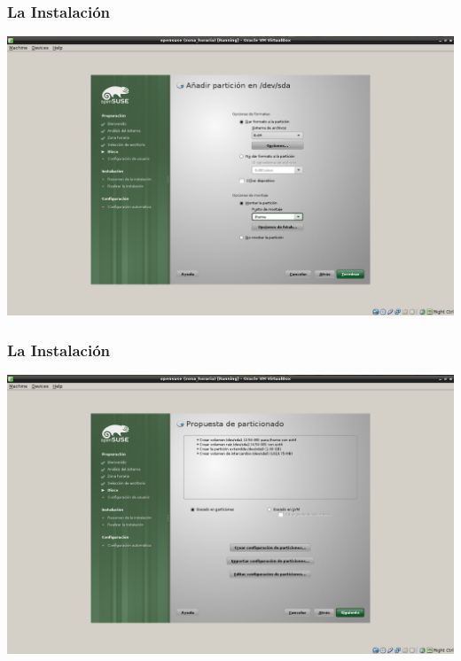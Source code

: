 \documentclass{beamer}
\begin{document}
\begin{frame}
\frametitle{La Instalaci\'on}
\includegraphics[height=0.8\textheight]{10.png} \hspace*{7.3cm}
\end{frame} 

\begin{frame}
\frametitle{La Instalaci\'on}
\includegraphics[height=0.8\textheight]{11.png} \hspace*{7.3cm}
\end{frame} 
\end{document}
